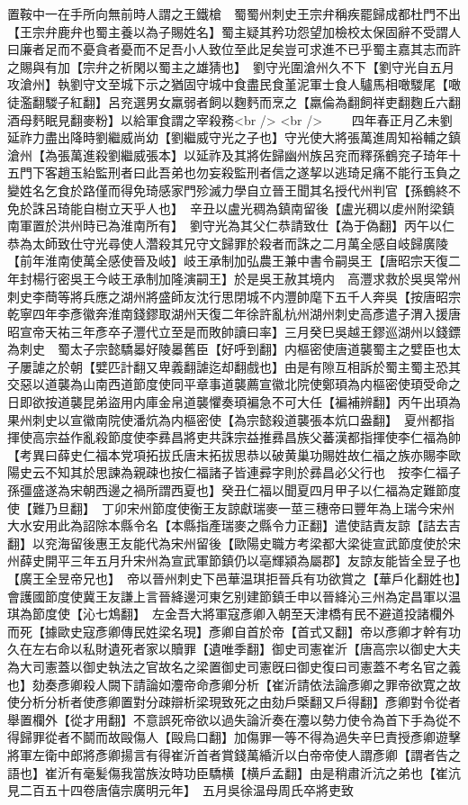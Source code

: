 置鞍中一在手所向無前時人謂之王鐵槍　蜀蜀州刺史王宗弁稱疾罷歸成都杜門不出【王宗弁鹿弁也蜀主養以為子賜姓名】蜀主疑其矜功怨望加檢校太保固辭不受謂人曰廉者足而不憂貪者憂而不足吾小人致位至此足矣豈可求進不已乎蜀主嘉其志而許之賜與有加【宗弁之祈閑以蜀主之雄猜也】　劉守光圍滄州久不下【劉守光自五月攻滄州】執劉守文至城下示之猶固守城中食盡民食堇泥軍士食人驢馬相噉騣尾【噉徒濫翻騣子紅翻】呂兖選男女羸弱者飼以麴麫而烹之【羸倫為翻飼祥吏翻麴丘六翻酒母麫眠見翻麥粉】以給軍食謂之宰殺務<br />
<br />
　　四年春正月乙未劉延祚力盡出降時劉繼威尚幼【劉繼威守光之子也】守光使大將張萬進周知裕輔之鎮滄州【為張萬進殺劉繼威張本】以延祚及其將佐歸幽州族呂兖而釋孫鶴兖子琦年十五門下客趙玉紿監刑者曰此吾弟也勿妄殺監刑者信之遂挈以逃琦足痛不能行玉負之變姓名乞食於路僅而得免琦感家門殄滅力學自立晉王聞其名授代州判官【孫鶴終不免於誅呂琦能自樹立天乎人也】　辛丑以盧光稠為鎮南留後【盧光稠以䖍州附梁鎮南軍置於洪州時已為淮南所有】　劉守光為其父仁恭請致仕【為于偽翻】丙午以仁恭為太師致仕守光尋使人濳殺其兄守文歸罪於殺者而誅之二月萬全感自岐歸廣陵【前年淮南使萬全感使晉及岐】岐王承制加弘農王兼中書令嗣吳王【唐昭宗天復二年封楊行密吳王今岐王承制加隆演嗣王】於是吳王赦其境内　高灃求救於吳吳常州刺史李蕳等將兵應之湖州將盛師友沈行思閉城不内灃帥麾下五千人奔吳【按唐昭宗乾寧四年李彥徽奔淮南錢鏐取湖州天復二年徐許亂杭州湖州刺史高彥遣子渭入援唐昭宣帝天祐三年彥卒子灃代立至是而敗帥讀曰率】三月癸巳吳越王鏐巡湖州以錢鏢為刺史　蜀太子宗懿驕㬥好陵㬥舊臣【好呼到翻】内樞密使唐道襲蜀主之嬖臣也太子屢謔之於朝【嬖匹計翻又卑義翻謔迄却翻戲也】由是有隙互相訴於蜀主蜀主恐其交惡以道襲為山南西道節度使同平章事道襲薦宣徽北院使鄭頊為内樞密使頊受命之日即欲按道襲昆弟盜用内庫金帛道襲懼奏頊褊急不可大任【褊補辨翻】丙午出頊為果州刺史以宣徽南院使潘炕為内樞密使【為宗懿殺道襲張本炕口盎翻】　夏州都指揮使高宗益作亂殺節度使李彞昌將吏共誅宗益推彞昌族父蕃漢都指揮使李仁福為帥　【考異曰薛史仁福本党項拓拔氏唐末拓拔思恭以破黄巢功賜姓故仁福之族亦賜李歐陽史云不知其於思諫為親疎也按仁福諸子皆連彛字則於彞昌必父行也　按李仁福子孫彊盛遂為宋朝西邊之禍所謂西夏也】癸丑仁福以聞夏四月甲子以仁福為定難節度使【難乃旦翻】　丁卯宋州節度使衡王友諒獻瑞麥一莖三穗帝曰豐年為上瑞今宋州大水安用此為詔除本縣令名【本縣指產瑞麥之縣令力正翻】遣使詰責友諒【詰去吉翻】以兖海留後惠王友能代為宋州留後【歐陽史職方考梁都大梁徙宣武節度使於宋州薛史開平三年五月升宋州為宣武軍節鎮仍以亳輝潁為屬郡】友諒友能皆全昱子也【廣王全昱帝兄也】　帝以晉州刺史下邑華温琪拒晉兵有功欲賞之【華戶化翻姓也】會護國節度使冀王友謙上言晉絳邊河東乞别建節鎮壬申以晉絳沁三州為定昌軍以温琪為節度使【沁七鴆翻】　左金吾大將軍寇彥卿入朝至天津橋有民不避道投諸欄外而死【據歐史寇彥卿傳民姓梁名現】彥卿自首於帝【首式又翻】帝以彥卿才幹有功久在左右命以私財遺死者家以贖罪【遺唯季翻】御史司憲崔沂【唐高宗以御史大夫為大司憲蓋以御史執法之官故名之梁置御史司憲旣曰御史復曰司憲蓋不考名官之義也】劾奏彥卿殺人闕下請論如灋帝命彥卿分析【崔沂請依法論彥卿之罪帝欲寛之故使分析分析者使彥卿置對分疎辯析梁現致死之由劾戶㮣翻又戶得翻】彥卿對令從者舉置欄外【從才用翻】不意誤死帝欲以過失論沂奏在灋以勢力使令為首下手為從不得歸罪從者不鬬而故毆傷人【毆烏口翻】加傷罪一等不得為過失辛巳責授彥卿遊擊將軍左衛中郎將彥卿揚言有得崔沂首者賞錢萬緍沂以白帝帝使人謂彥卿【謂者告之語也】崔沂有毫髪傷我當族汝時功臣驕横【横戶孟翻】由是稍肅沂沆之弟也【崔沆見二百五十四卷唐僖宗廣明元年】　五月吳徐温母周氏卒將吏致